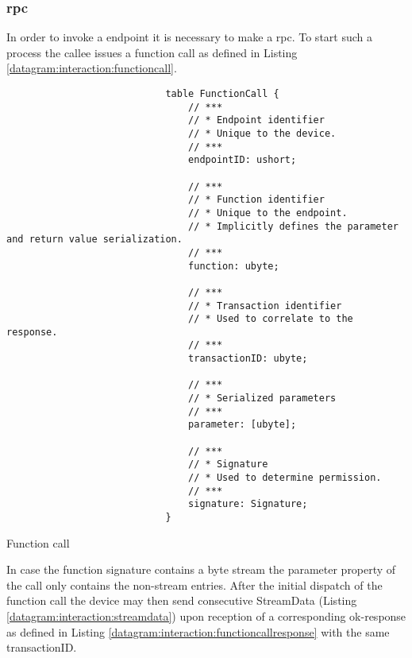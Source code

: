 \documentclass[a4paper]{report}
\begin{document}
                
                \clearpage
                \subsubsection[\acrshort{rpc}]{\acrlong{rpc}}\label{section:interaction:device:endpoints:rpc}
                    In order to invoke a endpoint it is necessary to make a \acrshort{rpc}. To start such a process the callee issues a function call as defined in Listing \ref{datagram:interaction:functioncall}.
                    \begin{listing}
                        \begin{verbatim}
                            table FunctionCall {
                                // ***
                                // * Endpoint identifier
                                // * Unique to the device.
                                // ***
                                endpointID: ushort;
                                
                                // ***
                                // * Function identifier
                                // * Unique to the endpoint.
                                // * Implicitly defines the parameter and return value serialization.
                                // ***
                                function: ubyte;
                                
                                // ***
                                // * Transaction identifier
                                // * Used to correlate to the response.
                                // ***
                                transactionID: ubyte;
                                
                                // ***
                                // * Serialized parameters
                                // ***
                                parameter: [ubyte];
                                
                                // ***
                                // * Signature
                                // * Used to determine permission.
                                // ***
                                signature: Signature;
                            }
                        \end{verbatim}
                        \caption{Function call}
                        \label{datagram:interaction:functioncall}
                    \end{listing}
                    In case the function signature contains a byte stream the parameter property of the call only contains the non-stream entries. After the initial dispatch of the function call the device may then send consecutive StreamData (Listing \ref{datagram:interaction:streamdata}) upon reception of a corresponding ok-response as defined in Listing \ref{datagram:interaction:functioncallresponse} with the same transactionID.
                    
\end{document}
